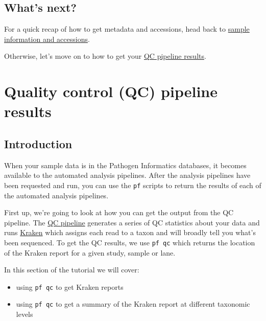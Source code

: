 \documentclass[11pt]{article}
\providecommand{\tightlist}{%
      \setlength{\itemsep}{0pt}\setlength{\parskip}{0pt}}
\begin{document}
    \hypertarget{whats-next}{%
\subsection{What's next?}\label{whats-next}}

For a quick recap of how to get metadata and accessions, head back to
\href{information-and-accessions.ipynb}{sample information and
accessions}.

Otherwise, let's move on to how to get your
\href{qc-pipeline-results.ipynb}{QC pipeline results}.





\newpage






    \hypertarget{quality-control-qc-pipeline-results}{%
\section{Quality control (QC) pipeline
results}\label{quality-control-qc-pipeline-results}}

    \hypertarget{introduction}{%
\subsection{Introduction}\label{introduction}}

When your sample data is in the Pathogen Informatics databases, it
becomes available to the automated analysis pipelines. After the
analysis pipelines have been requested and run, you can use the
\texttt{pf} scripts to return the results of each of the automated
analysis pipelines.

First up, we're going to look at how you can get the output from the QC
pipeline. The
\href{http://mediawiki.internal.sanger.ac.uk/index.php/Pathogen_Sequencing_Informatics\#QC_Pipeline}{QC
pipeline} generates a series of QC statistics about your data and runs
\href{https://ccb.jhu.edu/software/kraken/}{Kraken} which assigns each
read to a taxon and will broadly tell you what's been sequenced. To get
the QC results, we use \texttt{pf\ qc} which returns the location of the
Kraken report for a given study, sample or lane.

In this section of the tutorial we will cover:

\begin{itemize}
\tightlist
\item
  using \texttt{pf\ qc} to get Kraken reports
\item
  using \texttt{pf\ qc} to get a summary of the Kraken report at
  different taxonomic levels
\end{itemize}
\end{document}

